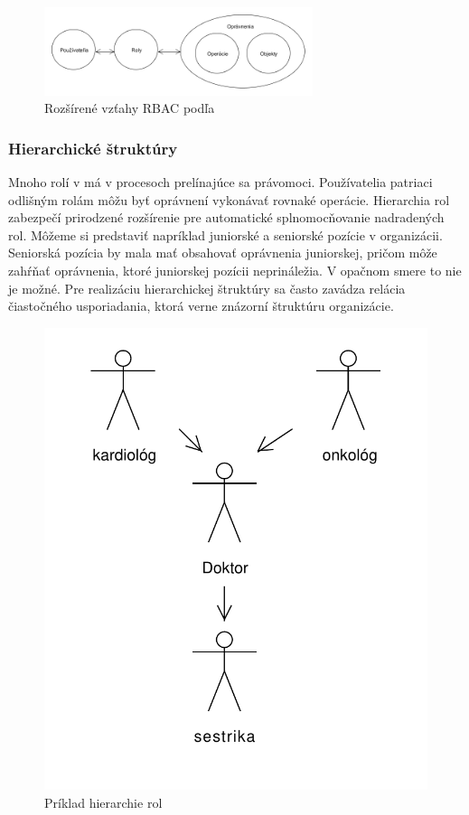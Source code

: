 \begin{figure}[h]
	\centerline{\includegraphics[width=0.7\textwidth]{images/rbac_kuhn_full}}
	\caption{Rozšírené vzťahy RBAC podľa \cite{kuhn}}
	\label{obr:rbac_kuhn_full}
\end{figure}



\subsubsection{Hierarchické štruktúry}
Mnoho rolí v má v procesoch prelínajúce sa právomoci. Používatelia patriaci odlišným rolám môžu byť oprávnení vykonávať rovnaké operácie. Hierarchia rol zabezpečí prirodzené rozšírenie pre automatické splnomocňovanie nadradených rol. Môžeme si predstaviť napríklad juniorské a seniorské pozície v organizácii. Seniorská pozícia by mala mať obsahovať oprávnenia juniorskej, pričom môže zahŕňať oprávnenia, ktoré juniorskej pozícii neprináležia.   V opačnom smere to nie je možné.  Pre realizáciu hierarchickej štruktúry sa často zavádza relácia čiastočného usporiadania, ktorá verne znázorní štruktúru organizácie. 

\begin{figure}[h]
	\centerline{\includegraphics[height=0.45\textwidth]{images/hierarchia_priklad}}
	\caption{Príklad hierarchie rol}
	\label{obr:rbac_hierarchy}
\end{figure}






